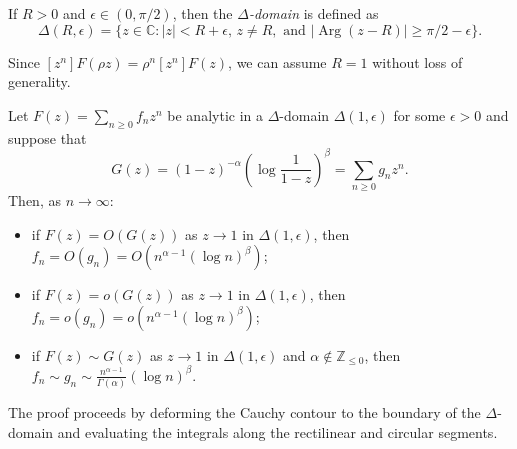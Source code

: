 If \(R > 0\) and \(\epsilon \in (0, \pi/2)\), then the \emph{\(\Delta\)-domain} is defined as
\[
    \Delta(R, \epsilon) = \{ z \in \mathbb{C} : |z| < R + \epsilon, \, z \neq R, \text{ and } |\operatorname{Arg}(z-R)| \ge \pi/2 - \epsilon \}.
\]

Since \([z^n] F(\rho z) = \rho^{n} [z^n] F(z)\), we can assume \(R = 1\) without loss of generality.

\begin{theorem}
    Let \(F(z) = \sum_{n \ge 0} f_n z^n\) be analytic in a \(\Delta\)-domain \(\Delta(1, \epsilon)\) for some \(\epsilon > 0\) and suppose that
    \[
        G(z) = (1-z)^{-\alpha} \left( \log \frac{1}{1-z} \right)^\beta = \sum_{n \ge 0} g_n z^n.
    \]
    Then, as \(n \to \infty\):
    \begin{itemize}
        \item if \(F(z) = O(G(z))\) as \(z \to 1\) in \(\Delta(1, \epsilon)\), then \(f_n = O(g_n) = O\left(n^{\alpha - 1} (\log n)^\beta\right)\);
        \item if \(F(z) = o(G(z))\) as \(z \to 1\) in \(\Delta(1, \epsilon)\), then \(f_n = o(g_n) = o\left(n^{\alpha - 1} (\log n)^\beta\right)\);
        \item if \(F(z) \sim G(z)\) as \(z \to 1\) in \(\Delta(1, \epsilon)\) and \(\alpha \notin \mathbb{Z}_{\le 0}\), then \(f_n \sim g_n \sim \frac{n^{\alpha - 1}}{\Gamma(\alpha)} (\log n)^\beta\).
    \end{itemize}
\end{theorem}

\begin{remark}
    The proof proceeds by deforming the Cauchy contour to the boundary of the \(\Delta\)-domain and evaluating the integrals along the rectilinear and circular segments.
\end{remark}

